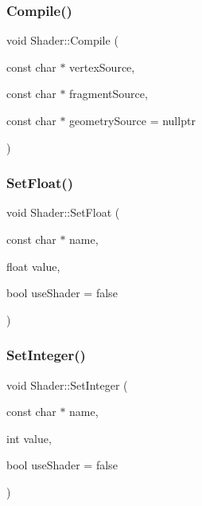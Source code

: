 \mbox{\label{classShader_ace30758935fc09126ec99f5b602cb18f}} 
\subsubsection{\texorpdfstring{Compile()}{Compile()}}
{\footnotesize\ttfamily void Shader\+::\+Compile (\begin{DoxyParamCaption}\item[{const char $\ast$}]{vertex\+Source,  }\item[{const char $\ast$}]{fragment\+Source,  }\item[{const char $\ast$}]{geometry\+Source = {\ttfamily nullptr} }\end{DoxyParamCaption})}

\mbox{\label{classShader_a90a74282cd77e51812cd2c0ed0eb5cad}} 
\subsubsection{\texorpdfstring{Set\+Float()}{SetFloat()}}
{\footnotesize\ttfamily void Shader\+::\+Set\+Float (\begin{DoxyParamCaption}\item[{const char $\ast$}]{name,  }\item[{float}]{value,  }\item[{bool}]{use\+Shader = {\ttfamily false} }\end{DoxyParamCaption})}

\mbox{\label{classShader_aac20695848a1a8a283e23d36b0557c20}} 
\subsubsection{\texorpdfstring{Set\+Integer()}{SetInteger()}}
{\footnotesize\ttfamily void Shader\+::\+Set\+Integer (\begin{DoxyParamCaption}\item[{const char $\ast$}]{name,  }\item[{int}]{value,  }\item[{bool}]{use\+Shader = {\ttfamily false} }\end{DoxyParamCaption})}

